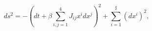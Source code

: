 \begin{equation}
\label{metn2M}
ds^2 = - \left( dt + \beta \sum_{i,j=1}^{4} J_{ij} x^i dx^j \right)^2
+ \sum_{i=1}^{\sharp} (dx^i)^2, 
\end{equation}

